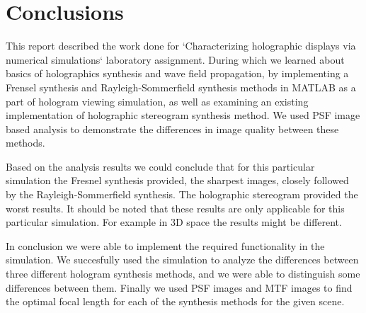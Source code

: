 \documentclass[12pt,a4paper,english
]{tunithesis}
\begin{document}
\chapter{Conclusions}
This report described the work done for `Characterizing holographic displays via
numerical simulations` laboratory assignment. During which we learned about basics of holographics synthesis and wave field propagation, by implementing a Frensel synthesis and Rayleigh-Sommerfield synthesis methods in MATLAB as a part of hologram viewing simulation, as well as examining an existing implementation of holographic stereogram synthesis method. We used PSF image based analysis to demonstrate the differences in image quality between these methods.

Based on the analysis results we could conclude that for this particular simulation the Fresnel synthesis provided, the sharpest images, closely followed by the Rayleigh-Sommerfield synthesis. The holographic stereogram provided the worst results. It should be noted that these results are only applicable for this particular simulation. For example in 3D space the results might be different.

In conclusion we were able to implement the required functionality in the simulation. We succesfully used the simulation to analyze the differences between three different hologram synthesis methods, and we were able to distinguish some differences between them. Finally we used PSF images and MTF images to find the optimal focal length for each of the synthesis methods for the given scene.

\label{ch:conclusions}


%
%
\newpage

\printbibliography[title=References]
\end{document}

